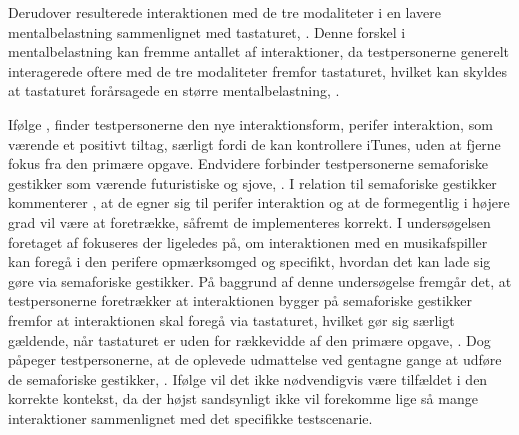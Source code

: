 Derudover resulterede interaktionen med de tre modaliteter i en lavere mentalbelastning sammenlignet med tastaturet, \parencite[s. 172]{PDF:ComparingInputModalities}. Denne forskel i mentalbelastning kan fremme antallet af interaktioner, da testpersonerne generelt interagerede oftere med de tre modaliteter fremfor tastaturet, hvilket kan skyldes at tastaturet forårsagede en større mentalbelastning, \parencite[ss. 174-175]{PDF:ComparingInputModalities}.    

Ifølge \textcite[ss. 173-174]{PDF:ComparingInputModalities}, finder testpersonerne den nye interaktionsform, perifer interaktion, som værende et positivt tiltag, særligt fordi de kan kontrollere iTunes, uden at fjerne fokus fra den primære opgave. Endvidere forbinder testpersonerne semaforiske gestikker som værende futuristiske og sjove, \parencite[s. 174]{PDF:ComparingInputModalities}. I relation til semaforiske gestikker kommenterer \textcite[s. 177]{PDF:ComparingInputModalities}, at de egner sig til perifer interaktion og at de formegentlig i højere grad vil være at foretrække, såfremt de implementeres korrekt.\blankline
%                    
I undersøgelsen foretaget af \textcite{PDF:AStudyOnTheUseOfSemaphoricGestures} fokuseres der ligeledes på, om interaktionen med en musikafspiller kan foregå i den perifere opmærksomged og specifikt, hvordan det kan lade sig gøre via semaforiske gestikker. På baggrund af denne undersøgelse fremgår det, at testpersonerne foretrækker at interaktionen bygger på semaforiske gestikker fremfor at interaktionen skal foregå via tastaturet, hvilket gør sig særligt gældende, når tastaturet er uden for rækkevidde af den primære opgave, \parencite[s. 1963]{PDF:AStudyOnTheUseOfSemaphoricGestures}. Dog påpeger testpersonerne, at de oplevede udmattelse ved gentagne gange at udføre de semaforiske gestikker, \parencite[s. 1963]{PDF:AStudyOnTheUseOfSemaphoricGestures}. Ifølge \textcite[s. 1963]{PDF:AStudyOnTheUseOfSemaphoricGestures} vil det ikke nødvendigvis være tilfældet i den korrekte kontekst, da der højst sandsynligt ikke vil forekomme lige så mange interaktioner sammenlignet med det specifikke testscenarie. 

